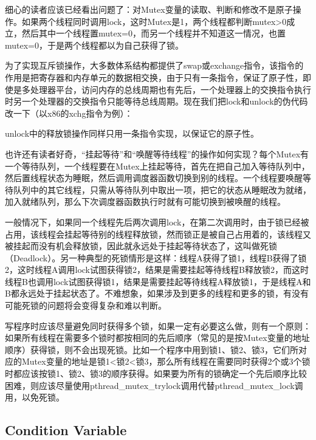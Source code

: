 细心的读者应该已经看出问题了：对Mutex变量的读取、判断和修改不是原子操作。如果两个线程同时调用lock，这时Mutex是1，两个线程都判断mutex\textgreater{}0成立，然后其中一个线程置mutex=\BookSplit{}0，而另一个线程并不知道这一情况，也置mutex=\BookSplit{}0，于是两个线程都以为自己获得了锁。



为了实现互斥锁操作，大多数体系结构都提供了swap或exchange指令，该指令的作用是把寄存器和内存单元的数据相交换，由于只有一条指令，保证了原子性，即使是多处理器平台，访问内存的总线周期也有先后，一个处理器上的交换指令执行时另一个处理器的交换指令只能等待总线周期。现在我们把lock和unlock的伪代码改一下（以x86的xchg指令为例）：




unlock中的释放锁操作同样只用一条指令实现，以保证它的原子性。



也许还有读者好奇，“挂起等待”和“唤醒等待线程”的操作如何实现？每个Mutex有一个等待队列，一个线程要在Mutex上挂起等待，首先在把自己加入等待队列中，然后置线程状态为睡眠，然后调用调度器函数切换到别的线程。一个线程要唤醒等待队列中的其它线程，只需从等待队列中取出一项，把它的状态从睡眠改为就绪，加入就绪队列，那么下次调度器函数执行时就有可能切换到被唤醒的线程。



一般情况下，如果同一个线程先后两次调用lock，在第二次调用时，由于锁已经被占用，该线程会挂起等待别的线程释放锁，然而锁正是被自己占用着的，该线程又被挂起而没有机会释放锁，因此就永远处于挂起等待状态了，这叫做死锁（Deadlock）。另一种典型的死锁情形是这样：线程A获得了锁1，线程B获得了锁2，这时线程A调用lock试图获得锁2，结果是需要挂起等待线程B释放锁2，而这时线程B也调用lock试图获得锁1，结果是需要挂起等待线程A释放锁1，于是线程A和B都永远处于挂起状态了。不难想象，如果涉及到更多的线程和更多的锁，有没有可能死锁的问题将会变得复杂和难以判断。



写程序时应该尽量避免同时获得多个锁，如果一定有必要这么做，则有一个原则：如果所有线程在需要多个锁时都按相同的先后顺序（常见的是按Mutex变量的地址顺序）获得锁，则不会出现死锁。比如一个程序中用到锁1、锁2、锁3，它们所对应的Mutex变量的地址是锁1\textless{}锁2\textless{}锁3，那么所有线程在需要同时获得2个或3个锁时都应该按锁1、锁2、锁3的顺序获得。如果要为所有的锁确定一个先后顺序比较困难，则应该尽量使用pthread\_\BookSplit{}mutex\_\BookSplit{}trylock调用代替pthread\_\BookSplit{}mutex\_\BookSplit{}lock调用，以免死锁。


\subsection{Condition Variable}
%


